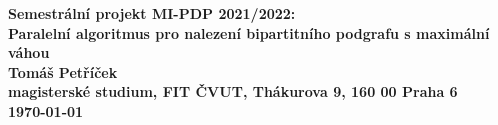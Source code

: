 \begin{center}
\bf Semestrální projekt MI-PDP 2021/2022:\\[5mm]
    Paralelní algoritmus pro nalezení bipartitního podgrafu s maximální váhou\\[5mm]
       Tomáš Petříček\\[2mm]
magisterské studium, FIT ČVUT, Thákurova 9, 160 00 Praha 6\\[2mm]
\today
\end{center}
